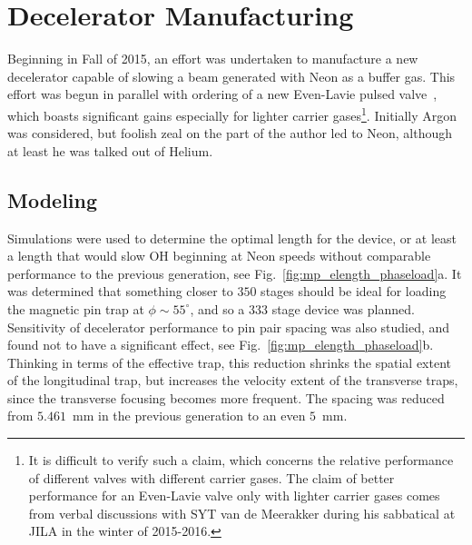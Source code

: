 \section{Decelerator Manufacturing}

Beginning in Fall of 2015, an effort was undertaken to manufacture a new decelerator capable of slowing a beam generated with Neon as a buffer gas. 
This effort was begun in parallel with ordering of a new Even-Lavie pulsed valve~\cite{Even2015}, which boasts significant gains especially for lighter carrier gases\footnote{It is difficult to verify such a claim, which concerns the relative performance of different valves with different carrier gases. The claim of better performance for an Even-Lavie valve only with lighter carrier gases comes from verbal discussions with SYT van de Meerakker during his sabbatical at JILA in the winter of 2015-2016.}.
Initially Argon was considered, but foolish zeal on the part of the author led to Neon, although at least he was talked out of Helium.

\subsection{Modeling}

Simulations were used to determine the optimal length for the device, or at least a length that would slow OH beginning at Neon speeds without comparable performance to the previous generation, see Fig.~\ref{fig:mp_elength_phaseload}a.
It was determined that something closer to $350$ stages should be ideal for loading the magnetic pin trap at $\phi\sim 55^\circ$, and so a $333$ stage device was planned.
Sensitivity of decelerator performance to pin pair spacing was also studied, and found not to have a significant effect, see Fig.~\ref{fig:mp_elength_phaseload}b.
Thinking in terms of the effective trap, this reduction shrinks the spatial extent of the longitudinal trap, but increases the velocity extent of the transverse traps, since the transverse focusing becomes more frequent.
The spacing was reduced from $5.461$~mm in the previous generation to an even $5$~mm.

